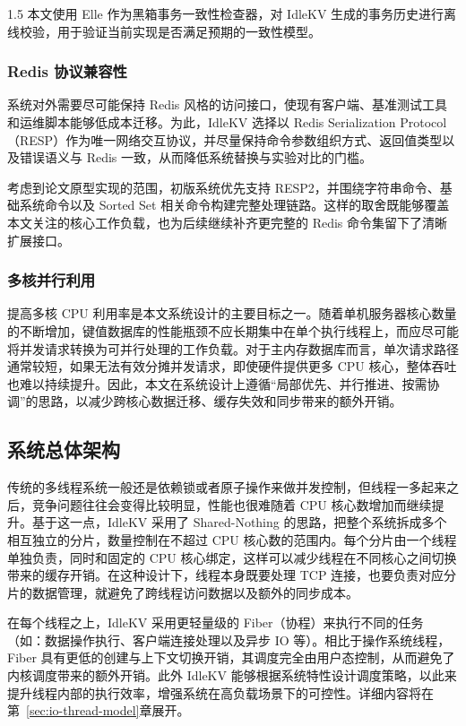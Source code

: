 \documentclass[a4paper,12pt,fontset=none,twoside]{article}
\numberwithin{figure}{section}
\numberwithin{equation}{section}
\numberwithin{table}{section}
\begin{document}
\begin{spacing}{1.5}
	本文使用 Elle\cite{Elle} 作为黑箱事务一致性检查器，对 IdleKV 生成的事务历史进行离线校验，用于验证当前实现是否满足预期的一致性模型。

	\subsubsection{Redis 协议兼容性}

	系统对外需要尽可能保持 Redis 风格的访问接口，使现有客户端、基准测试工具和运维脚本能够低成本迁移。为此，IdleKV 选择以 Redis Serialization Protocol（RESP）作为唯一网络交互协议，并尽量保持命令参数组织方式、返回值类型以及错误语义与 Redis 一致，从而降低系统替换与实验对比的门槛。

	考虑到论文原型实现的范围，初版系统优先支持 RESP2，并围绕字符串命令、基础系统命令以及 Sorted Set 相关命令构建完整处理链路。这样的取舍既能够覆盖本文关注的核心工作负载，也为后续继续补齐更完整的 Redis 命令集留下了清晰扩展接口。

	\subsubsection{多核并行利用}

	提高多核 CPU 利用率是本文系统设计的主要目标之一。随着单机服务器核心数量的不断增加，键值数据库的性能瓶颈不应长期集中在单个执行线程上，而应尽可能将并发请求转换为可并行处理的工作负载。对于主内存数据库而言，单次请求路径通常较短，如果无法有效分摊并发请求，即使硬件提供更多 CPU 核心，整体吞吐也难以持续提升。因此，本文在系统设计上遵循“局部优先、并行推进、按需协调”的思路，以减少跨核心数据迁移、缓存失效和同步带来的额外开销。

	\subsection{系统总体架构}

	传统的多线程系统一般还是依赖锁或者原子操作来做并发控制，但线程一多起来之后，竞争问题往往会变得比较明显，性能也很难随着 CPU 核心数增加而继续提升。基于这一点，IdleKV 采用了 Shared-Nothing\cite{The-Case-for-Shared-Nothing} 的思路，把整个系统拆成多个相互独立的分片，数量控制在不超过 CPU 核心数的范围内。每个分片由一个线程单独负责，同时和固定的 CPU 核心绑定，这样可以减少线程在不同核心之间切换带来的缓存开销。在这种设计下，线程本身既要处理 TCP 连接，也要负责对应分片的数据管理，就避免了跨线程访问数据以及额外的同步成本。
	
	在每个线程之上，IdleKV 采用更轻量级的 Fiber（协程）来执行不同的任务（如：数据操作执行、客户端连接处理以及异步 IO 等）。相比于操作系统线程，Fiber 具有更低的创建与上下文切换开销，其调度完全由用户态控制，从而避免了内核调度带来的额外开销。此外 IdleKV 能够根据系统特性设计调度策略，以此来提升线程内部的执行效率，增强系统在高负载场景下的可控性。详细内容将在第~\ref{sec:io-thread-model}章展开。


\end{spacing}
\end{document}
